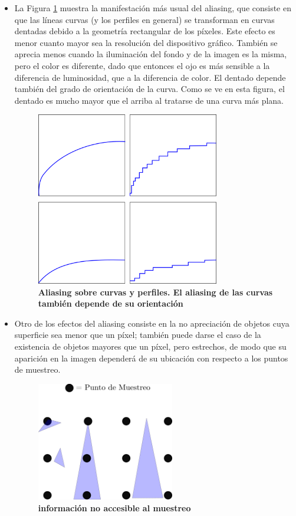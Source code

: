 \begin{enumerate}
    \begin{itemize}
        \item La Figura \ref{fig:grafica17} muestra la manifestación más usual del aliasing, que consiste en que las líneas curvas (y los perfiles en general) se transforman en curvas dentadas debido a la geometría rectangular de los píxeles. Este efecto es menor cuanto mayor sea la resolución del dispositivo gráfico. También se aprecia menos cuando la iluminación del fondo y de la imagen es la misma, pero el color es diferente, dado que entonces el ojo es más sensible a la diferencia de luminosidad, que a la diferencia de color. El dentado depende también del grado de orientación de la curva. Como se ve en esta figura, el dentado es mucho mayor que el arriba al tratarse de una curva más plana.  
        \begin{figure}[h]
        \includegraphics[width=8cm]{Img/CPD/grafica17.png}
        \centering
        \caption{\textbf{\footnotesize{ Aliasing sobre curvas y perfiles. El aliasing de las curvas también depende de su orientación  }}}
        \label{fig:grafica17}
        \end{figure}
    
        \item Otro de los efectos del aliasing consiste en la no apreciación de objetos
        cuya superficie sea menor que un píxel; también puede darse el caso de la existencia de objetos mayores que un píxel, pero estrechos, de modo que su aparición en la imagen dependerá de su ubicación con respecto a los puntos de muestreo.

        \begin{figure}[h]
        \includegraphics[width=6cm]{Img/CPD/grafica18.png}
        \centering
        \caption{\textbf{\footnotesize{ información no accesible al muestreo   }}}
        \label{fig:grafica18}
        \end{figure}
        

\end{itemize}
\end{enumerate}
